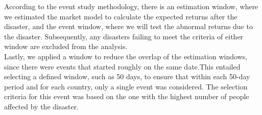 \documentclass{article}
\begin{document}
According to the event study methodology, there is an estimation window, where we estimated the market model to calculate the expected returns after the disaster, and the event window, where we will test the abnormal returns due to the disaster. Subsequently, any disasters failing to meet the criteria of either window are excluded from the analysis. \\
Lastly, we applied a window to reduce the overlap of the estimation windows, since there were events that started roughly on the same date.This entailed selecting a defined window, such as 50 days, to ensure that within each 50-day period and for each country, only a single event was considered. The selection criteria for this event was based on the one with the highest number of people affected by the disaster.
\end{document}

